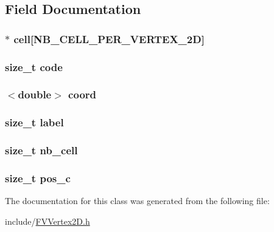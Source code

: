 \subsection{Field Documentation}
\hypertarget{classFVVertex2D_a2e88df41fb480687d9c7ed51db6f0226}{
\subsubsection[{cell}]{$\ast$ {\bf cell}\mbox{[}NB\_\-CELL\_\-PER\_\-VERTEX\_\-2D\mbox{]}}}
\label{d5/dbb/classFVVertex2D_a2e88df41fb480687d9c7ed51db6f0226}
\hypertarget{classFVVertex2D_acf258c3b3328a96e3ee1e3b875b7874f}{
\subsubsection[{code}]{\setlength{\rightskip}{0pt plus 5cm}size\_\-t {\bf code}}}
\label{d5/dbb/classFVVertex2D_acf258c3b3328a96e3ee1e3b875b7874f}
\hypertarget{classFVVertex2D_a7df51306f5a4f82e51aec0d168ce5ac2}{
\subsubsection[{coord}]{$<$double$>$ {\bf coord}}}
\label{d5/dbb/classFVVertex2D_a7df51306f5a4f82e51aec0d168ce5ac2}
\hypertarget{classFVVertex2D_a1ec973463c76e6d9e91160720959ad68}{
\subsubsection[{label}]{\setlength{\rightskip}{0pt plus 5cm}size\_\-t {\bf label}}}
\label{d5/dbb/classFVVertex2D_a1ec973463c76e6d9e91160720959ad68}
\hypertarget{classFVVertex2D_a1a5a11cfc8bbaa0cf132759c0382da70}{
\subsubsection[{nb\_\-cell}]{\setlength{\rightskip}{0pt plus 5cm}size\_\-t {\bf nb\_\-cell}}}
\label{d5/dbb/classFVVertex2D_a1a5a11cfc8bbaa0cf132759c0382da70}
\hypertarget{classFVVertex2D_a4a8207cde821dc3afcfb83f8645d62ef}{
\subsubsection[{pos\_\-c}]{\setlength{\rightskip}{0pt plus 5cm}size\_\-t {\bf pos\_\-c}}}
\label{d5/dbb/classFVVertex2D_a4a8207cde821dc3afcfb83f8645d62ef}


The documentation for this class was generated from the following file:\begin{DoxyCompactItemize}
\item 
include/\hyperlink{FVVertex2D_8h}{FVVertex2D.h}\end{DoxyCompactItemize}

